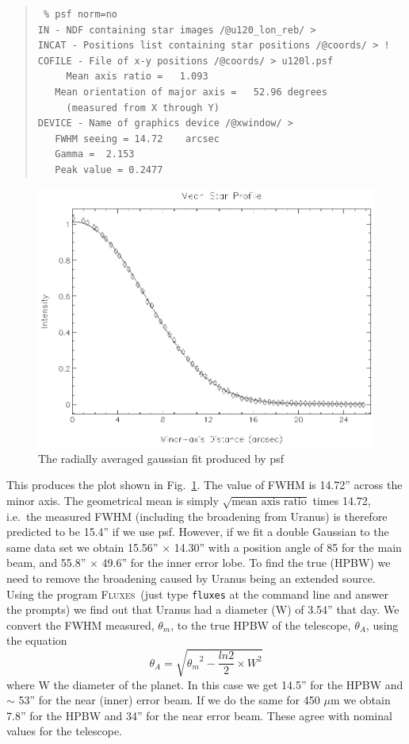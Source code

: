 \documentclass[twoside,11pt]{article}
\newenvironment{myquote}{\begin{quote}\begin{small}}{\end{small}\end{quote}}
\newcommand{\fluxes}{\xref{\textsc{Fluxes}}{sun213}{}}
\newcommand{\task}[1]{\textsf{#1}}
\newcommand{\psf}{\xref{\task{psf}}{sun95}{PSF}}
\newcommand{\xref}[3]{#1}
\renewcommand{\_}{\texttt{\symbol{95}}}
\begin{document}
\begin{myquote}
\begin{verbatim}
 % psf norm=no
IN - NDF containing star images /@u120_lon_reb/ >
INCAT - Positions list containing star positions /@coords/ > !
COFILE - File of x-y positions /@coords/ > u120l.psf
     Mean axis ratio =   1.093
   Mean orientation of major axis =   52.96 degrees
     (measured from X through Y)
DEVICE - Name of graphics device /@xwindow/ >
   FWHM seeing = 14.72    arcsec
   Gamma =  2.153
   Peak value = 0.2477
\end{verbatim}
\end{myquote}

\begin{figure}
\begin{center}
\includegraphics[width=5.5in]{sc11_fig12.eps}
\caption{The radially averaged gaussian fit produced by \psf}
\label{fig:psf}
\end{center}
\end{figure}


This produces the plot shown in Fig.\ \ref{fig:psf}.  The value of FWHM is
14.72'' across the minor axis.  The geometrical mean is simply
$\sqrt{\mbox{mean axis ratio}}$ times 14.72, i.e.\ the measured FWHM
(including the broadening from Uranus) is therefore predicted to be 15.4'' if
we use \psf.  However, if we fit a double Gaussian to the same data set we
obtain 15.56'' $\times$ 14.30'' with a position angle of 85 for the main beam,
and 55.8'' $\times$ 49.6'' for the inner error lobe.  To find the true (HPBW)
we need to remove the broadening caused by Uranus being an extended source.
Using the program \fluxes\ (just type \texttt{fluxes} at the command line and
answer the prompts) we find out that Uranus had a diameter (W) of 3.54'' that
day.  We convert the FWHM measured, $\theta_m$, to the true HPBW of the
telescope, $\theta_{A}$, using the equation \begin{equation} \theta_{A} =
  \sqrt{{\theta_m}^{2} - \frac{ln2}{2} \times W^{2} } \end{equation} where W
the diameter of the planet.  In this case we get 14.5'' for the HPBW and
$\sim$ 53'' for the near (inner) error beam.  If we do the same for 450 $\mu$m
we obtain 7.8'' for the HPBW and 34'' for the near error beam.  These agree
with nominal values for the telescope.
\end{document}
